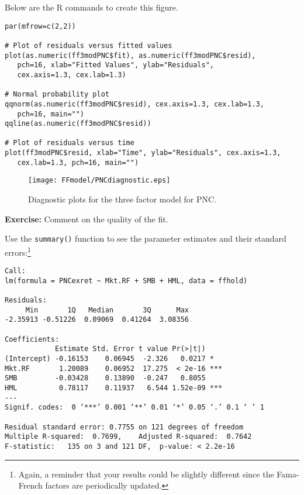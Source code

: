 \documentclass{report}
\begin{document}
Below are the R commands to create this figure.

\normalsize
\begin{verbatim}
par(mfrow=c(2,2))

# Plot of residuals versus fitted values
plot(as.numeric(ff3modPNC$fit), as.numeric(ff3modPNC$resid),
   pch=16, xlab="Fitted Values", ylab="Residuals",
   cex.axis=1.3, cex.lab=1.3)

# Normal probability plot
qqnorm(as.numeric(ff3modPNC$resid), cex.axis=1.3, cex.lab=1.3, 
   pch=16, main="")
qqline(as.numeric(ff3modPNC$resid))

# Plot of residuals versus time
plot(ff3modPNC$resid, xlab="Time", ylab="Residuals", cex.axis=1.3,
   cex.lab=1.3, pch=16, main="")
\end{verbatim}
\Large

\newpage

\begin{figure}[ht]
\begin{center}
\texttt{[image: FFmodel/PNCdiagnostic.eps]}
\vspace{-.2in}
\caption{Diagnostic plots for the three factor model for PNC.}
\label{PNCdiagnostic}
\end{center}
\end{figure}

\textcolor{qcol}{{\bf Exercise:} Comment on the quality of the fit.}


\newpage

Use the {\tt summary()} function to see
the parameter estimates and their standard errors:\footnote{Again, a reminder
that your results could be slightly different since the Fama-French factors are
periodically updated.}

\normalsize
\begin{verbatim}
Call:
lm(formula = PNCexret ~ Mkt.RF + SMB + HML, data = ffhold)

Residuals:
     Min       1Q   Median       3Q      Max 
-2.35913 -0.51226  0.09069  0.41264  3.08356 

Coefficients:
            Estimate Std. Error t value Pr(>|t|)    
(Intercept) -0.16153    0.06945  -2.326   0.0217 *  
Mkt.RF       1.20089    0.06952  17.275  < 2e-16 ***
SMB         -0.03428    0.13890  -0.247   0.8055    
HML          0.78117    0.11937   6.544 1.52e-09 ***
---
Signif. codes:  0 ‘***’ 0.001 ‘**’ 0.01 ‘*’ 0.05 ‘.’ 0.1 ‘ ’ 1

Residual standard error: 0.7755 on 121 degrees of freedom
Multiple R-squared:  0.7699,	Adjusted R-squared:  0.7642 
F-statistic:   135 on 3 and 121 DF,  p-value: < 2.2e-16
\end{verbatim}
\Large
\end{document}
